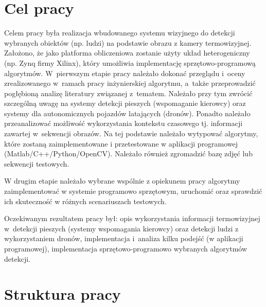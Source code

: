 \section{Cel pracy}

Celem pracy była realizacja wbudowanego systemu wizyjnego do detekcji wybranych obiektów (np. ludzi) na podstawie obrazu z kamery termowizyjnej. 
Założono, że jako platforma obliczeniowa zostanie użyty układ heterogeniczny (np. Zynq firmy Xilinx), który umożliwia implementację sprzętowo-programową algorytmów.
W~pierwszym etapie pracy należało dokonać przeglądu i~oceny zrealizowanego w~ramach pracy inżynierskiej algorytmu, a~także przeprowadzić pogłębioną analizę literatury związanej z~tematem. 
Należało przy tym zwrócić szczególną uwagę na systemy detekcji pieszych (wspomaganie kierowcy) oraz systemy dla autonomicznych pojazdów latających (dronów). 
Ponadto należało przeanalizować możliwość wykorzystania kontekstu czasowego tj. informacji zawartej w~sekwencji obrazów. 
Na tej podstawie należało wytypować algorytmy, które zostaną zaimplementowane i przetestowane w aplikacji programowej (Matlab/C++/Python/OpenCV). 
Należało również zgromadzić bazę zdjęć lub sekwencji testowych.

W drugim etapie należało wybrane wspólnie z opiekunem pracy algorytmy zaimplementować w systemie programowo sprzętowym, uruchomić oraz sprawdzić ich skuteczność w różnych scenariuszach testowych.

Oczekiwanym rezultatem pracy był: opis wykorzystania informacji termowizyjnej w~detekcji pieszych (systemy wspomagania kierowcy) oraz detekcji ludzi z wykorzystaniem dronów, implementacja i~analiza kilku podejść (w aplikacji programowej), implementacja sprzętowo-programowo wybranych algorytmów detekcji.

\section{Struktura pracy}

